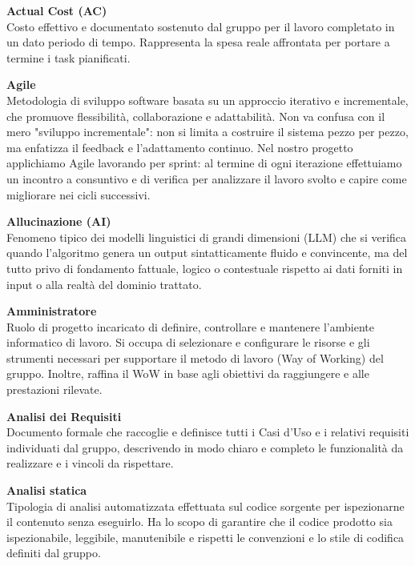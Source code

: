 \documentclass[12pt, a4paper]{article}
\begin{document}
\noindent\hypertarget{actual-cost}{\textbf{Actual Cost (AC)}} \\[0.1em]
Costo effettivo e documentato sostenuto dal gruppo per il lavoro completato in un dato periodo di tempo. Rappresenta la spesa reale affrontata per portare a termine i task pianificati.
\vspace{0.5cm}

\noindent\hypertarget{agile}{\textbf{Agile}} \\[0.1em]
Metodologia di sviluppo software basata su un approccio iterativo e incrementale, che promuove flessibilità, collaborazione e adattabilità. Non va confusa con il mero "sviluppo incrementale": non si limita a costruire il sistema pezzo per pezzo, ma enfatizza il feedback e l'adattamento continuo. Nel nostro progetto applichiamo Agile lavorando per sprint: al termine di ogni iterazione effettuiamo un incontro a consuntivo e di verifica per analizzare il lavoro svolto e capire come migliorare nei cicli successivi.
\vspace{0.5cm}

\noindent\hypertarget{allucinazione}{\textbf{Allucinazione (AI)}} \\[0.1em]
Fenomeno tipico dei modelli linguistici di grandi dimensioni (LLM) che si verifica quando l'algoritmo genera un output sintatticamente fluido e convincente, ma del tutto privo di fondamento fattuale, logico o contestuale rispetto ai dati forniti in input o alla realtà del dominio trattato.
\vspace{0.5cm}

\noindent\hypertarget{amministratore}{\textbf{Amministratore}} \\[0.1em]
Ruolo di progetto incaricato di definire, controllare e mantenere l'ambiente informatico di lavoro. Si occupa di selezionare e configurare le risorse e gli strumenti necessari per supportare il metodo di lavoro (Way of Working) del gruppo. Inoltre, raffina il WoW in base agli obiettivi da raggiungere e alle prestazioni rilevate.
\vspace{0.5cm}

\noindent\hypertarget{analisi-dei-requisiti}{\textbf{Analisi dei Requisiti}} \\[0.1em]
Documento formale che raccoglie e definisce tutti i Casi d'Uso e i relativi requisiti individuati dal gruppo, descrivendo in modo chiaro e completo le funzionalità da realizzare e i vincoli da rispettare.
\vspace{0.5cm}

\newpage
\noindent\hypertarget{analisi-statica}{\textbf{Analisi statica}} \\[0.1em]
Tipologia di analisi automatizzata effettuata sul codice sorgente per ispezionarne il contenuto senza eseguirlo. Ha lo scopo di garantire che il codice prodotto sia ispezionabile, leggibile, manutenibile e rispetti le convenzioni e lo stile di codifica definiti dal gruppo.
\vspace{0.5cm}  
\end{document}
